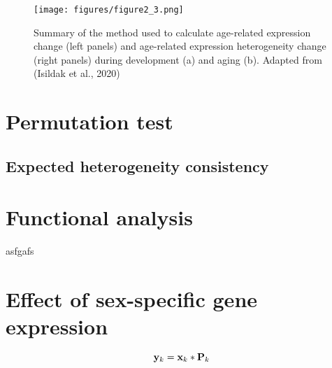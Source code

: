 \begin{figure}[h]
\centering
\texttt{[image: figures/figure2\_3.png]}
\caption{Summary of the method used to calculate age-related expression change (left panels) and age-related expression heterogeneity change (right panels) during development (a) and aging (b). Adapted from (Isildak et al., 2020)}\label{fig:fig2.3}
\end{figure}

\section{Permutation test}

\subsection{Expected heterogeneity consistency}

\section{Functional analysis}
asfgafs

\section{Effect of sex-specific gene expression}



\begin{equation}
{\bf y}_k = {\bf x}_k * {\bf P}_k
\end{equation}

























